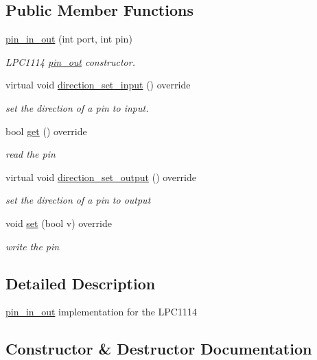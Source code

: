 \subsection*{Public Member Functions}
\begin{DoxyCompactItemize}
\item 
\hyperlink{classdb103_1_1pin__in__out_a4c2cd30248539e0e37cf7a95b40c73dd}{pin\+\_\+in\+\_\+out} (int port, int pin)
\begin{DoxyCompactList}\small\item\em L\+P\+C1114 \hyperlink{classdb103_1_1pin__out}{pin\+\_\+out} constructor. \end{DoxyCompactList}\item 
virtual void \hyperlink{classdb103_1_1pin__in__out_af03a8c83335daf7c529a6a73fdfbf1b4}{direction\+\_\+set\+\_\+input} () override
\begin{DoxyCompactList}\small\item\em set the direction of a pin to input. \end{DoxyCompactList}\item 
bool \hyperlink{classdb103_1_1pin__in__out_ab76b179e185068c87af404d3e620954e}{get} () override
\begin{DoxyCompactList}\small\item\em read the pin \end{DoxyCompactList}\item 
virtual void \hyperlink{classdb103_1_1pin__in__out_a55b94d79329ccbe2a263e954cccc1ba9}{direction\+\_\+set\+\_\+output} () override
\begin{DoxyCompactList}\small\item\em set the direction of a pin to output \end{DoxyCompactList}\item 
void \hyperlink{classdb103_1_1pin__in__out_a45fca06e527503565429a278dc0b1322}{set} (bool v) override
\begin{DoxyCompactList}\small\item\em write the pin \end{DoxyCompactList}\end{DoxyCompactItemize}


\subsection{Detailed Description}
\hyperlink{classdb103_1_1pin__in__out}{pin\+\_\+in\+\_\+out} implementation for the L\+P\+C1114 

\subsection{Constructor \& Destructor Documentation}
